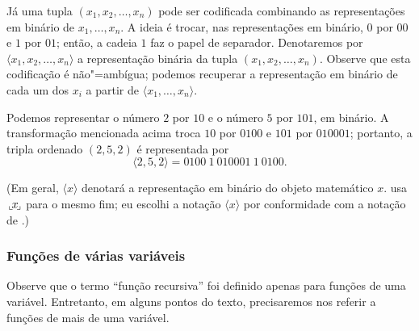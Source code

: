 Já uma tupla $(x_1, x_2, \dots, x_n)$ pode ser codificada
combinando as representações em binário de $x_1, \dots, x_n$.
A ideia é trocar, nas representações em binário,
$0$ por $00$ e $1$ por $01$;
então, a cadeia $1$ faz o papel de separador.
Denotaremos por $\langle x_1, x_2, \dots, x_n \rangle$
a representação binária da tupla $(x_1, x_2, \dots, x_n)$.
Observe que esta codificação é não"=ambígua;
podemos recuperar a representação em binário de cada um dos $x_i$
a partir de $\langle x_1, \dots, x_n \rangle$.

\begin{example}
    Podemos representar o número $2$ por $10$ e o número $5$ por $101$,
    em binário.
    A transformação mencionada acima troca $10$ por $0100$
    e $101$ por $010001$;
    portanto, a tripla ordenado $(2, 5, 2)$ é representada por
    \begin{equation*}
        \langle 2, 5, 2 \rangle = 0100\ 1\ 010001\ 1\ 0100.
    \end{equation*}
\end{example}

(Em geral, $\langle x \rangle$ denotará a representação em binário
do objeto matemático $x$.
 usa
$\sideset{_\llcorner}{_\lrcorner}{\mathop{\makebox[0.5ex]{$x$}}}$
para o mesmo fim;
eu escolhi a notação $\langle x \rangle$
por conformidade com a notação de .)


\subsubsection{Funções de várias variáveis}

Observe que o termo ``função recursiva''
foi definido apenas para funções de uma variável.
Entretanto,
em alguns pontos do texto,
precisaremos nos referir a funções de mais de uma variável.

